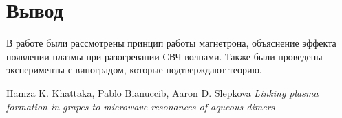 \documentclass[a4paper,12pt]{article}
\begin{document}
	\section{Вывод}
	В работе были рассмотрены принцип работы магнетрона, объяснение эффекта появлении плазмы при разогревании СВЧ волнами. Также были проведены эксперименты с виноградом, которые подтверждают теорию.

	
		
	
	\begin{thebibliography}{}
		  Hamza K. Khattaka, Pablo Bianuccib, Aaron D. Slepkova \textit{Linking plasma formation in grapes to microwave resonances of aqueous dimers}
	\end{thebibliography}
	
\end{document}
